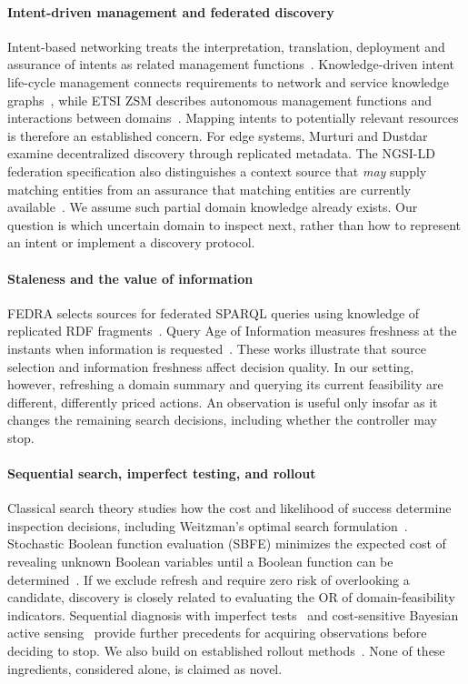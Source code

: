\documentclass[conference]{IEEEtran}
\begin{document}
\paragraph{Intent-driven management and federated discovery}
Intent-based networking treats the interpretation, translation, deployment and assurance of intents as related management functions~\cite{leivadeas2023survey}. Knowledge-driven intent life-cycle management connects requirements to network and service knowledge graphs~\cite{mehmood2025lifecycle}, while ETSI ZSM describes autonomous management functions and interactions between domains~\cite{etsi2024zsm}. Mapping intents to potentially relevant resources is therefore an established concern. For edge systems, Murturi and Dustdar~\cite{murturi2022metadata} examine decentralized discovery through replicated metadata. The NGSI-LD federation specification also distinguishes a context source that \emph{may} supply matching entities from an assurance that matching entities are currently available~\cite{etsi2025ngsild}. We assume such partial domain knowledge already exists. Our question is which uncertain domain to inspect next, rather than how to represent an intent or implement a discovery protocol.

\paragraph{Staleness and the value of information}
FEDRA selects sources for federated SPARQL queries using knowledge of replicated RDF fragments~\cite{montoya2015fedra}. Query Age of Information measures freshness at the instants when information is requested~\cite{chiariotti2022qaoi}. These works illustrate that source selection and information freshness affect decision quality. In our setting, however, refreshing a domain summary and querying its current feasibility are different, differently priced actions. An observation is useful only insofar as it changes the remaining search decisions, including whether the controller may stop.

\paragraph{Sequential search, imperfect testing, and rollout}
Classical search theory studies how the cost and likelihood of success determine inspection decisions, including Weitzman's optimal search formulation~\cite{weitzman1979}. Stochastic Boolean function evaluation (SBFE) minimizes the expected cost of revealing unknown Boolean variables until a Boolean function can be determined~\cite{gkenosis2022sbfe}. If we exclude refresh and require zero risk of overlooking a candidate, discovery is closely related to evaluating the OR of domain-feasibility indicators. Sequential diagnosis with imperfect tests~\cite{wei2017imperfect} and cost-sensitive Bayesian active sensing~\cite{ahmad2014active} provide further precedents for acquiring observations before deciding to stop. We also build on established rollout methods~\cite{bertsekas1999rollout}. None of these ingredients, considered alone, is claimed as novel.
\end{document}
